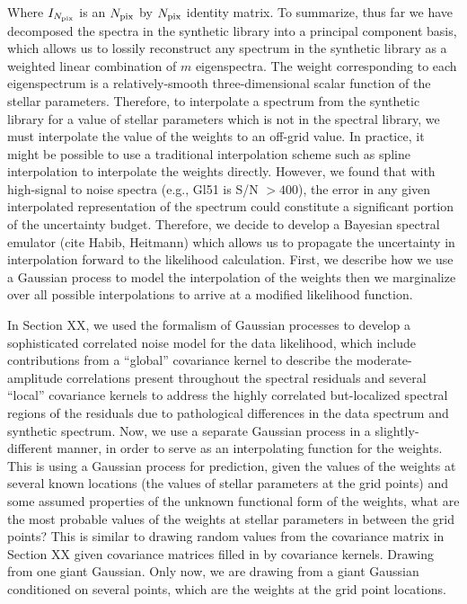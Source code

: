 \documentclass[iop,floatfix,twocolappendix]{emulateapj}
\begin{document}
Where $I_{N_{\rm pix}}$ is an $N_{\rm pix}$ by $N_{\rm pix}$ identity matrix. To summarize, thus far we have decomposed the spectra in the synthetic library into a principal component basis, which allows us to lossily reconstruct any spectrum in the synthetic library as a weighted linear combination of $m$ eigenspectra. The weight corresponding to each eigenspectrum is a relatively-smooth three-dimensional scalar function of the stellar parameters. Therefore, to interpolate a spectrum from the synthetic library for a value of stellar parameters which is not in the spectral library, we must interpolate the value of the weights to an off-grid value. In practice, it might be possible to use a traditional interpolation scheme such as spline interpolation to interpolate the weights directly. However, we found that with high-signal to noise spectra (e.g., Gl51 is S/N $> 400$), the error in any given interpolated representation of the spectrum could constitute a significant portion of the uncertainty budget. Therefore, we decide to develop a Bayesian spectral emulator (cite Habib, Heitmann) which allows us to propagate the uncertainty in interpolation forward to the likelihood calculation. First, we describe how we use a Gaussian process to model the interpolation of the weights then we marginalize over all possible interpolations to arrive at a modified likelihood function. 

In Section XX, we used the formalism of Gaussian processes to develop a sophisticated correlated noise model for the data likelihood, which include contributions from a ``global'' covariance kernel to describe the moderate-amplitude correlations present throughout the spectral residuals and several ``local'' covariance kernels to address the highly correlated but-localized spectral regions of the residuals due to pathological differences in the data spectrum and synthetic spectrum. Now, we use a separate Gaussian process in a slightly-different manner, in order to serve as an interpolating function for the weights. This is using a Gaussian process for prediction, given the values of the weights at several known locations (the values of stellar parameters at the grid points) and some assumed properties of the unknown functional form of the weights, what are the most probable values of the weights at stellar parameters in between the grid points? This is similar to drawing random values from the covariance matrix in Section XX given covariance matrices filled in by covariance kernels. Drawing from one giant Gaussian. Only now, we are drawing from a giant Gaussian conditioned on several points, which are the weights at the grid point locations.
\end{document}
